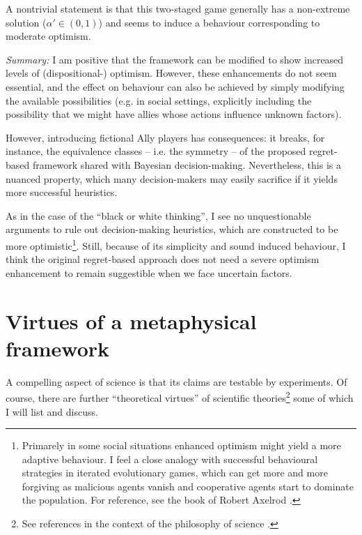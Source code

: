 \documentclass{article}
\begin{document}
A nontrivial statement is that this two-staged game generally has a non-extreme solution ($\alpha' \in (0,1)$) and seems to induce a behaviour corresponding to moderate optimism.

{\it Summary:}
I am positive that the framework can be modified to show increased levels of (dispositional-) optimism. 
However, these enhancements do not seem essential, and the effect on behaviour can also be achieved by simply modifying the available possibilities (e.g. in social settings, explicitly including the possibility that we might have allies whose actions influence unknown factors).

However, introducing fictional Ally players has consequences: it breaks, for instance, the equivalence classes -- i.e. the symmetry -- of the proposed regret-based framework shared with Bayesian decision-making.
Nevertheless, this is a nuanced property, which many decision-makers may easily sacrifice if it yields more successful heuristics.

As in the case of the ``black or white thinking'', I see no unquestionable arguments to rule out decision-making heuristics, which are constructed to be more optimistic\footnote{Primarely in some social situations enhanced optimism might yield a more adaptive behaviour. I feel a close analogy with successful behavioural strategies in iterated evolutionary games, which can get more and more forgiving as malicious agents vanish and cooperative agents start to dominate the population. For reference, see the book of Robert Axelrod \cite{book:Axelrod}.}. Still, because of its simplicity and sound induced behaviour, I think the original regret-based approach does not need a severe optimism enhancement to remain suggestible when we face uncertain factors.


\section*{Virtues of a metaphysical framework}

A compelling aspect of science is that its claims are testable by experiments. Of course, there are further ``theoretical virtues'' of scientific theories\footnote{See references in the context of the philosophy of science \cite{paper:TheoreticalVirtues,book:TheoreticalVirtues}.} some of which I will list and discuss.
\end{document}
